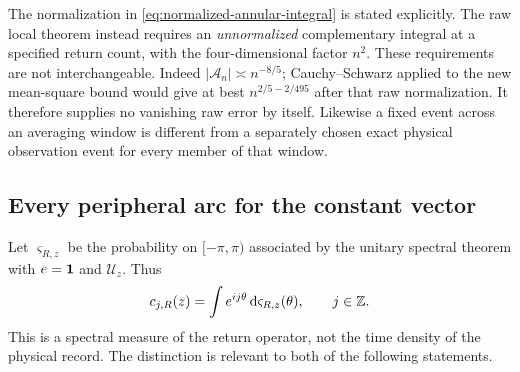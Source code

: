 The normalization in \eqref{eq:normalized-annular-integral} is stated
explicitly. The raw local theorem instead requires an \emph{unnormalized}
complementary integral at a specified return count, with the four-dimensional
factor $n^2$. These requirements are not interchangeable. Indeed
$|\mathcal A_n|\asymp n^{-8/5}$; Cauchy--Schwarz applied to the new
mean-square bound would give at best
$n^{2/5-2/495}$ after that raw normalization. It therefore supplies
no vanishing raw error by itself. Likewise a fixed event across an
averaging window is different from a separately chosen exact physical
observation event for every member of that window.

\subsection{Every peripheral arc for the constant vector}
Let $\varsigma_{R,z}$ be the probability on $[-\pi,\pi)$ associated
by the unitary spectral theorem with $e=\mathbf1$ and $\mathcal U_z$.
Thus
\begin{equation}\label{eq:cyclic-spectral-measure}
 c_{j,R}(z)=\int e^{ij\theta}\dd\varsigma_{R,z}(\theta),
                         \qquad j\in\Z.
\end{equation}
This is a spectral measure of the return operator, not the time density
of the physical record. The distinction is relevant to both of the
following statements.

